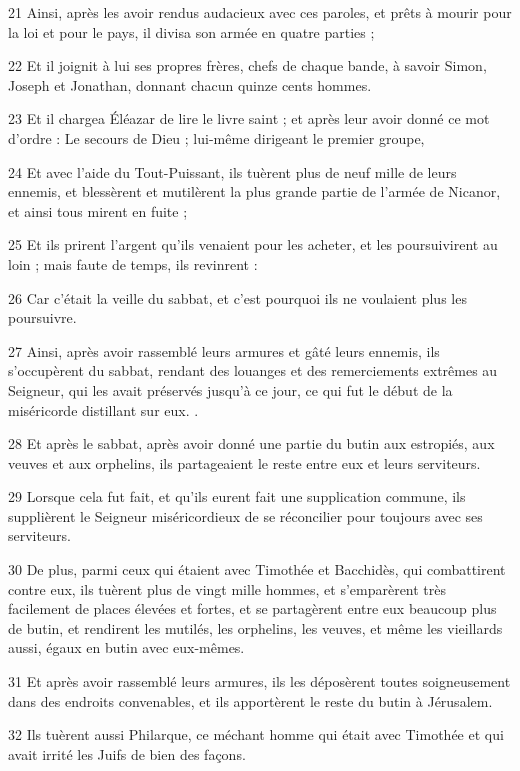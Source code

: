 \par 21 Ainsi, après les avoir rendus audacieux avec ces paroles, et prêts à mourir pour la loi et pour le pays, il divisa son armée en quatre parties ;
\par 22 Et il joignit à lui ses propres frères, chefs de chaque bande, à savoir Simon, Joseph et Jonathan, donnant chacun quinze cents hommes.
\par 23 Et il chargea Éléazar de lire le livre saint ; et après leur avoir donné ce mot d'ordre : Le secours de Dieu ; lui-même dirigeant le premier groupe,
\par 24 Et avec l'aide du Tout-Puissant, ils tuèrent plus de neuf mille de leurs ennemis, et blessèrent et mutilèrent la plus grande partie de l'armée de Nicanor, et ainsi tous mirent en fuite ;
\par 25 Et ils prirent l'argent qu'ils venaient pour les acheter, et les poursuivirent au loin ; mais faute de temps, ils revinrent :
\par 26 Car c'était la veille du sabbat, et c'est pourquoi ils ne voulaient plus les poursuivre.
\par 27 Ainsi, après avoir rassemblé leurs armures et gâté leurs ennemis, ils s'occupèrent du sabbat, rendant des louanges et des remerciements extrêmes au Seigneur, qui les avait préservés jusqu'à ce jour, ce qui fut le début de la miséricorde distillant sur eux. .
\par 28 Et après le sabbat, après avoir donné une partie du butin aux estropiés, aux veuves et aux orphelins, ils partageaient le reste entre eux et leurs serviteurs.
\par 29 Lorsque cela fut fait, et qu'ils eurent fait une supplication commune, ils supplièrent le Seigneur miséricordieux de se réconcilier pour toujours avec ses serviteurs.
\par 30 De plus, parmi ceux qui étaient avec Timothée et Bacchidès, qui combattirent contre eux, ils tuèrent plus de vingt mille hommes, et s'emparèrent très facilement de places élevées et fortes, et se partagèrent entre eux beaucoup plus de butin, et rendirent les mutilés, les orphelins, les veuves, et même les vieillards aussi, égaux en butin avec eux-mêmes.
\par 31 Et après avoir rassemblé leurs armures, ils les déposèrent toutes soigneusement dans des endroits convenables, et ils apportèrent le reste du butin à Jérusalem.
\par 32 Ils tuèrent aussi Philarque, ce méchant homme qui était avec Timothée et qui avait irrité les Juifs de bien des façons.
